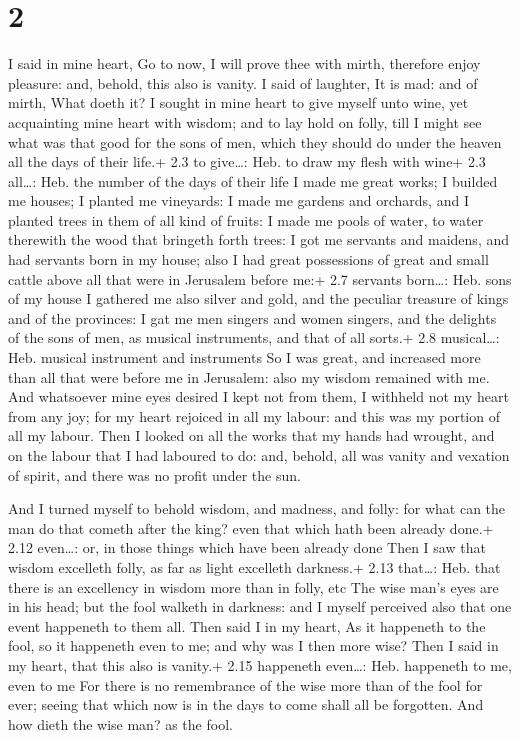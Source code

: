 \hypertarget{section-1}{%
\section{2}\label{section-1}}

 I said in mine heart, Go to now, I will prove thee with
mirth, therefore enjoy pleasure: and, behold, this also is vanity.
 I said of laughter, It is mad: and of mirth, What doeth it?
 I sought in mine heart to give myself unto wine, yet
acquainting mine heart with wisdom; and to lay hold on folly, till I
might see what was that good for the sons of men, which they should do
under the heaven all the days of their life.+ 2.3 to give\ldots: Heb. to
draw my flesh with wine+ 2.3 all\ldots: Heb. the number of the days of
their life  I made me great works; I builded me houses; I
planted me vineyards:  I made me gardens and orchards, and I
planted trees in them of all kind of fruits:  I made me
pools of water, to water therewith the wood that bringeth forth trees:
 I got me servants and maidens, and had servants born in my
house; also I had great possessions of great and small cattle above all
that were in Jerusalem before me:+ 2.7 servants born\ldots: Heb. sons of
my house  I gathered me also silver and gold, and the
peculiar treasure of kings and of the provinces: I gat me men singers
and women singers, and the delights of the sons of men, as musical
instruments, and that of all sorts.+ 2.8 musical\ldots: Heb. musical
instrument and instruments  So I was great, and increased
more than all that were before me in Jerusalem: also my wisdom remained
with me.  And whatsoever mine eyes desired I kept not from
them, I withheld not my heart from any joy; for my heart rejoiced in all
my labour: and this was my portion of all my labour.  Then
I looked on all the works that my hands had wrought, and on the labour
that I had laboured to do: and, behold, all was vanity and vexation of
spirit, and there was no profit under the sun.

 And I turned myself to behold wisdom, and madness, and
folly: for what can the man do that cometh after the king? even that
which hath been already done.+ 2.12 even\ldots: or, in those things
which have been already done  Then I saw that wisdom
excelleth folly, as far as light excelleth darkness.+ 2.13 that\ldots:
Heb. that there is an excellency in wisdom more than in folly, etc
 The wise man's eyes are in his head; but the fool walketh
in darkness: and I myself perceived also that one event happeneth to
them all.  Then said I in my heart, As it happeneth to the
fool, so it happeneth even to me; and why was I then more wise? Then I
said in my heart, that this also is vanity.+ 2.15 happeneth even\ldots:
Heb. happeneth to me, even to me  For there is no
remembrance of the wise more than of the fool for ever; seeing that
which now is in the days to come shall all be forgotten. And how dieth
the wise man? as the fool.

